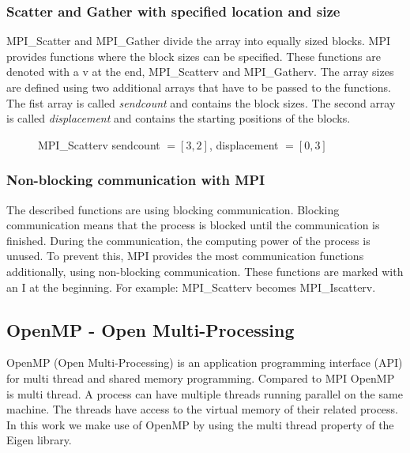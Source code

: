 \subsubsection{Scatter and Gather with specified location and size}
MPI\_Scatter and MPI\_Gather divide the array into equally sized blocks. MPI provides functions where the block sizes can be specified. These functions are denoted with a v at the end, MPI\_Scatterv and MPI\_Gatherv. The array sizes are defined using two additional arrays that have to be passed to the functions. The fist array is called \textit{sendcount} and contains the block sizes. The second array is called \textit{displacement} and contains the starting positions of the blocks. 
	\begin{figure}[H]
	\centering
	
	\caption[MPI\_Scatterv]{MPI\_Scatterv sendcount $ = [3,2]$, displacement  $= [0,3]$}
	\label{fig:MPIScatterv}
\end{figure}

\subsubsection{Non-blocking communication with MPI}
The described functions are using blocking communication.
Blocking communication means that the process is blocked until the communication is finished.
During the communication, the computing power of the process is unused.
To prevent this, MPI provides the most communication functions additionally, using non-blocking communication.
These functions are marked with an I at the beginning. For example: MPI\_Scatterv becomes MPI\_Iscatterv.


\subsection{OpenMP - Open Multi-Processing}
OpenMP (Open Multi-Processing) is an application programming interface (API) for multi thread and shared memory programming.
Compared to MPI OpenMP is multi thread. A process can have multiple threads running parallel on the same machine. The threads have access to the virtual memory of their related process.
In this work we make use of OpenMP by using the multi thread property of the Eigen library.

\newpage
